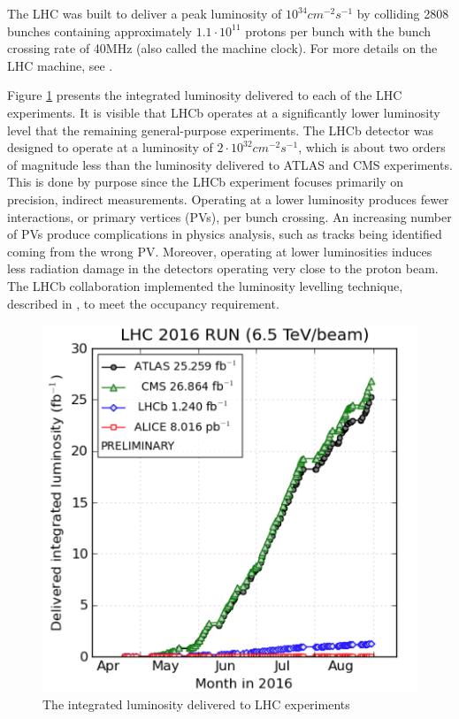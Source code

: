The LHC was built to deliver a peak luminosity of $10^{34} cm^{-2}s^{-1}$ by colliding 2808 bunches containing approximately $1.1 \cdot 10^{11}$ protons per bunch with the bunch crossing rate of 40MHz (also called the machine clock).  For more details on the LHC machine, see \cite{LHC_machine}.

Figure \ref{fig:Luminosity} presents the integrated luminosity delivered to each of the LHC experiments. It is visible that LHCb operates at a significantly lower luminosity level that the remaining general-purpose experiments.  The LHCb detector was designed to operate at a luminosity of $2 \cdot 10^{32}cm^{-2}s^{-1}$, which is about two orders of magnitude less than the luminosity delivered to ATLAS and CMS experiments. This is done by purpose since the LHCb experiment focuses primarily on precision, indirect measurements. Operating at a lower luminosity produces fewer interactions, or primary vertices (PVs), per bunch crossing. An increasing number of PVs produce complications in physics analysis, such as tracks being identified coming from the wrong PV.  Moreover, operating at lower luminosities induces less radiation damage in the detectors operating very close to the proton beam. The LHCb collaboration implemented the luminosity levelling technique, described in \cite{lumi_down}, to meet the occupancy requirement. 

\begin{figure}
\centering
\includegraphics[scale=0.5]{figures/Luminosity.png}
\caption[Luminosity]{The integrated luminosity delivered to LHC experiments
\label{fig:Luminosity}}
\end{figure}

